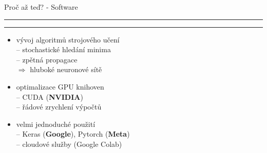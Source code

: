 \documentclass[aspectratio=43]{beamer}
\def\vs{\vspace{-2mm}}
\def\lend{\phantom{g}\vspace{1.5mm}\hrule\hrule}
\begin{document}
\begin{frame}{\vs Proč až teď? - Software \lend}
\vspace{3mm}
\begin{itemize}
    \small
    \item<1-> vývoj algoritmů strojového učení\\ \vspace{2mm}
        -- stochastické hledání minima\\ \vspace{2mm}
        -- zpětná propagace\\ \vspace{2mm} 
        $\Rightarrow$ hluboké neuronové sítě\\ \vspace{5mm} 
    \item<2-> optimalizace GPU knihoven\\ \vspace{2mm}
        -- CUDA (\textbf{NVIDIA})\\ \vspace{2mm}
        -- řádové zrychlení výpočtů\\ \vspace{5mm}
    \item<3-> velmi jednoduché použití\\ \vspace{2mm}
        -- Keras (\textbf{Google}), Pytorch (\textbf{Meta})\\ \vspace{2mm}
        -- cloudové služby (Google Colab)\\
\end{itemize}
\end{frame}
\end{document}
